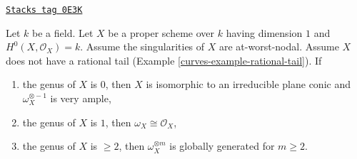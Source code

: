 \begin{lemma}
\label{curves-lemma-no-rational-tail-semiample-genus-geq-2}
\href{https://stacks.math.columbia.edu/tag/0E3K}{\texttt{Stacks tag 0E3K}}

Let $k$ be a field. Let $X$ be a proper scheme over $k$ having dimension $1$
and $H^0(X, \mathcal{O}_X) = k$. Assume the singularities of $X$ are
at-worst-nodal. Assume $X$ does not have a rational tail
(Example \ref{curves-example-rational-tail}). If
\begin{enumerate}
\item the genus of $X$ is $0$, then $X$ is isomorphic to an
irreducible plane conic and $\omega_X^{\otimes -1}$ is very ample,
\item the genus of $X$ is $1$, then $\omega_X \cong \mathcal{O}_X$,
\item the genus of $X$ is $\geq 2$, then
$\omega_X^{\otimes m}$ is globally generated for $m \geq 2$.
\end{enumerate}
\end{lemma}

